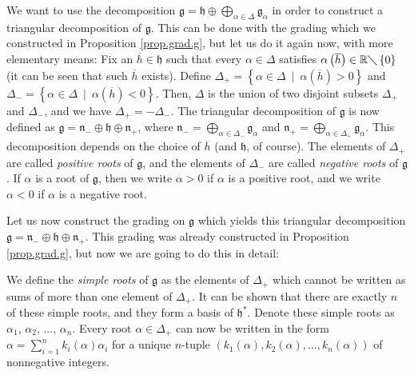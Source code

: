 \documentclass[etingof-lie.tex]{subfiles}
\begin{document}
We want to use the decomposition $\mathfrak{g}=\mathfrak{h}\oplus
\bigoplus\limits_{\alpha\in\Delta}\mathfrak{g}_{\alpha}$ in order to construct
a triangular decomposition of $\mathfrak{g}$. This can be done with the
grading which we constructed in Proposition \ref{prop.grad.g}, but let us do
it again now, with more elementary means: Fix an $\overline{h}\in\mathfrak{h}$
such that every $\alpha\in\Delta$ satisfies $\alpha\left(  \overline
{h}\right)  \in\mathbb{R}\diagdown\left\{  0\right\}  $ (it can be seen that
such $\overline{h}$ exists). Define $\Delta_{+}=\left\{  \alpha\in\Delta
\ \mid\ \alpha\left(  \overline{h}\right)  >0\right\}  $ and $\Delta
_{-}=\left\{  \alpha\in\Delta\ \mid\ \alpha\left(  \overline{h}\right)
<0\right\}  $. Then, $\Delta$ is the union of two disjoint subsets $\Delta
_{+}$ and $\Delta_{-}$, and we have $\Delta_{+}=-\Delta_{-}$. The triangular
decomposition of $\mathfrak{g}$ is now defined as $\mathfrak{g}=\mathfrak{n}%
_{-}\oplus\mathfrak{h}\oplus\mathfrak{n}_{+}$, where $\mathfrak{n}%
_{-}=\bigoplus\limits_{\alpha\in\Delta_{-}}\mathfrak{g}_{\alpha}$ and
$\mathfrak{n}_{+}=\bigoplus\limits_{\alpha\in\Delta_{+}}\mathfrak{g}_{\alpha}%
$. This decomposition depends on the choice of $\overline{h}$ (and
$\mathfrak{h}$, of course). The elements of $\Delta_{+}$ are called
\textit{positive roots} of $\mathfrak{g}$, and the elements of $\Delta_{-}$
are called \textit{negative roots} of $\mathfrak{g}$. If $\alpha$ is a root of
$\mathfrak{g}$, then we write $\alpha>0$ if $\alpha$ is a positive root, and
we write $\alpha<0$ if $\alpha$ is a negative root.

Let us now construct the grading on $\mathfrak{g}$ which yields this
triangular decomposition $\mathfrak{g}=\mathfrak{n}_{-}\oplus\mathfrak{h}%
\oplus\mathfrak{n}_{+}$. This grading was already constructed in Proposition
\ref{prop.grad.g}, but now we are going to do this in detail:

We define the \textit{simple roots} of $\mathfrak{g}$ as the elements of
$\Delta_{+}$ which cannot be written as sums of more than one element of
$\Delta_{+}$. It can be shown that there are exactly $n$ of these simple
roots, and they form a basis of $\mathfrak{h}^{\ast}$. Denote these simple
roots as $\alpha_{1}$, $\alpha_{2}$, $...$, $\alpha_{n}$. Every root
$\alpha\in\Delta_{+}$ can now be written in the form $\alpha=\sum
\limits_{i=1}^{n}k_{i}\left(  \alpha\right)  \alpha_{i}$ for a unique
$n$-tuple $\left(  k_{1}\left(  \alpha\right)  ,k_{2}\left(  \alpha\right)
,...,k_{n}\left(  \alpha\right)  \right)  $ of nonnegative integers.
\end{document}
